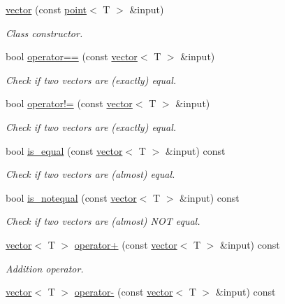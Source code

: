 \begin{DoxyCompactItemize}
\hyperlink{classddd_1_1vector_a6a9abe67c1ec0259649dc4647614a62c}{vector} (const \hyperlink{classddd_1_1point}{point}$<$ T $>$ \&input)
\begin{DoxyCompactList}\small\item\em Class constructor. \end{DoxyCompactList}\item 
bool \hyperlink{classddd_1_1vector_a5f26a6f471c836b723c94a5f68a3931d}{operator==} (const \hyperlink{classddd_1_1vector}{vector}$<$ T $>$ \&input)
\begin{DoxyCompactList}\small\item\em Check if two vectors are (exactly) equal. \end{DoxyCompactList}\item 
bool \hyperlink{classddd_1_1vector_a83fb6aea4121e7737ab7642aae23e2df}{operator!=} (const \hyperlink{classddd_1_1vector}{vector}$<$ T $>$ \&input)
\begin{DoxyCompactList}\small\item\em Check if two vectors are (exactly) equal. \end{DoxyCompactList}\item 
bool \hyperlink{classddd_1_1vector_a860847a7c7c93e52b4a83af722eb60f7}{is\+\_\+equal} (const \hyperlink{classddd_1_1vector}{vector}$<$ T $>$ \&input) const
\begin{DoxyCompactList}\small\item\em Check if two vectors are (almost) equal. \end{DoxyCompactList}\item 
bool \hyperlink{classddd_1_1vector_a73bf080395fbbdf9642cf5440d699013}{is\+\_\+notequal} (const \hyperlink{classddd_1_1vector}{vector}$<$ T $>$ \&input) const
\begin{DoxyCompactList}\small\item\em Check if two vectors are (almost) N\+OT equal. \end{DoxyCompactList}\item 
\hyperlink{classddd_1_1vector}{vector}$<$ T $>$ \hyperlink{classddd_1_1vector_a03e9624cbd1f3fa29247c1a67a8678d9}{operator+} (const \hyperlink{classddd_1_1vector}{vector}$<$ T $>$ \&input) const
\begin{DoxyCompactList}\small\item\em Addition operator. \end{DoxyCompactList}\item 
\hyperlink{classddd_1_1vector}{vector}$<$ T $>$ \hyperlink{classddd_1_1vector_aa047958a3d0cf3d3ff3d6ff571920ae0}{operator-\/} (const \hyperlink{classddd_1_1vector}{vector}$<$ T $>$ \&input) const

\end{DoxyCompactItemize}
